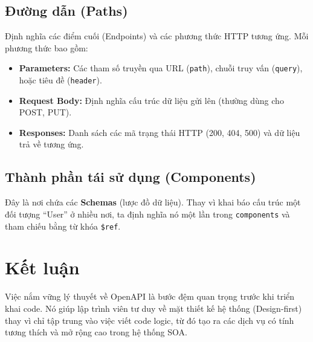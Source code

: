 \documentclass{article}
\begin{document}
\subsection{Đường dẫn (Paths)}
Định nghĩa các điểm cuối (Endpoints) và các phương thức HTTP tương ứng. Mỗi phương thức bao gồm:
\begin{itemize}
    \item \textbf{Parameters:} Các tham số truyền qua URL (\texttt{path}), chuỗi truy vấn (\texttt{query}), hoặc tiêu đề (\texttt{header}).
    \item \textbf{Request Body:} Định nghĩa cấu trúc dữ liệu gửi lên (thường dùng cho POST, PUT).
    \item \textbf{Responses:} Danh sách các mã trạng thái HTTP (200, 404, 500) và dữ liệu trả về tương ứng.
\end{itemize}

\subsection{Thành phần tái sử dụng (Components)}
Đây là nơi chứa các \textbf{Schemas} (lược đồ dữ liệu). Thay vì khai báo cấu trúc một đối tượng ``User'' ở nhiều nơi, ta định nghĩa nó một lần trong \texttt{components} và tham chiếu bằng từ khóa \texttt{\$ref}.

\section{Kết luận}
Việc nắm vững lý thuyết về OpenAPI là bước đệm quan trọng trước khi triển khai code. Nó giúp lập trình viên tư duy về mặt thiết kế hệ thống (Design-first) thay vì chỉ tập trung vào việc viết code logic, từ đó tạo ra các dịch vụ có tính tương thích và mở rộng cao trong hệ thống SOA.
\end{document}
